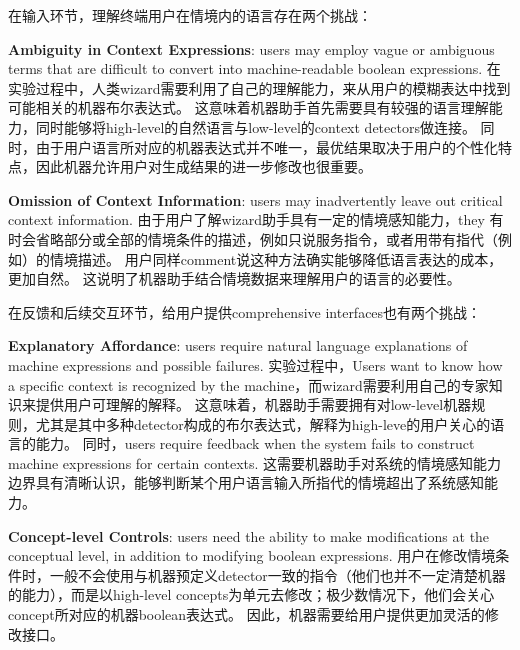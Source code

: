 在输入环节，理解终端用户在情境内的语言存在两个挑战：

\textbf{Ambiguity in Context Expressions}: users may employ vague or ambiguous terms that are difficult to convert into machine-readable boolean expressions.
在实验过程中，人类wizard需要利用了自己的理解能力，来从用户的模糊表达中找到可能相关的机器布尔表达式。
这意味着机器助手首先需要具有较强的语言理解能力，同时能够将high-level的自然语言与low-level的context detectors做连接。
同时，由于用户语言所对应的机器表达式并不唯一，最优结果取决于用户的个性化特点，因此机器允许用户对生成结果的进一步修改也很重要。

\textbf{Omission of Context Information}: users may inadvertently leave out critical context information.
由于用户了解wizard助手具有一定的情境感知能力，they 有时会省略部分或全部的情境条件的描述，例如只说服务指令，或者用带有指代（例如）的情境描述。
用户同样comment说这种方法确实能够降低语言表达的成本，更加自然。
这说明了机器助手结合情境数据来理解用户的语言的必要性。


在反馈和后续交互环节，给用户提供comprehensive interfaces也有两个挑战：

\textbf{Explanatory Affordance}: users require natural language explanations of machine expressions and possible failures.
实验过程中，Users want to know how a specific context is recognized by the machine，而wizard需要利用自己的专家知识来提供用户可理解的解释。
这意味着，机器助手需要拥有对low-level机器规则，尤其是其中多种detector构成的布尔表达式，解释为high-leve的用户关心的语言的能力。
同时，users require feedback when the system fails to construct machine expressions for certain contexts.
这需要机器助手对系统的情境感知能力边界具有清晰认识，能够判断某个用户语言输入所指代的情境超出了系统感知能力。

\textbf{Concept-level Controls}: users need the ability to make modifications at the conceptual level, in addition to modifying boolean expressions.
用户在修改情境条件时，一般不会使用与机器预定义detector一致的指令（他们也并不一定清楚机器的能力），而是以high-level concepts为单元去修改；极少数情况下，他们会关心concept所对应的机器boolean表达式。
因此，机器需要给用户提供更加灵活的修改接口。



